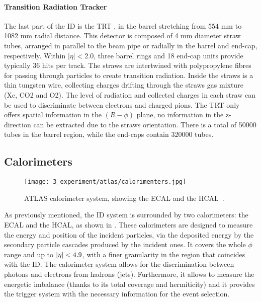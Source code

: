 \paragraph{Transition Radiation Tracker}
The last part of the \ac{ID} is the \ac{TRT} \cite{ATLAS-TRT-DesignPerformance}, in the barrel stretching from 554 mm to 1082 mm radial distance. This detector is composed of 4 mm diameter straw tubes, arranged in parallel to the beam pipe or radially in the barrel and end-cap, respectively. Within $|\eta| < 2.0$, three barrel rings and 18 end-cap units provide typically 36 hits per track. The straws are intertwined with polypropylene fibres for passing through particles to create transition radiation. Inside the straws is a thin tungsten wire, collecting charges drifting through the straws gas mixture (Xe, CO2 and O2). The level of radiation and collected charges in each straw can be used to discriminate between electrons and charged pions.  The \ac{TRT} only offers spatial information in the $(R-\phi)$ plane, no information in the z-direction can be extracted due to the straws orientation. There is a total of 50000 tubes in the barrel region, while the end-caps contain 320000 tubes.








\subsection{Calorimeters}

\begin{figure}[ht!]
    \centering
    \texttt{[image: 3\_experiment/atlas/calorimenters.jpg]}
    \caption{\ac{ATLAS} calorimeter system, showing the \acf{ECAL} and the \acf{HCAL}~\cite{ATLAS-Calorimeter-Diagram}.}
    \label{fig:atlas:atlas:atlas_calorimeters}
\end{figure}

As previously mentioned, the \ac{ID} system is surrounded by two calorimeters: the \acf{ECAL} and the \acf{HCAL}, as shown in \Fig{\ref{fig:atlas:atlas:atlas_calorimeters}}. These calorimeters are designed to measure the energy and position of the incident particles, via the deposited energy by the secondary particle cascades produced by the incident ones. It covers the whole \(\phi\) range and up to \(|\eta|<4.9\), with a finer granularity in the region that coincides with the \ac{ID}.
The calorimeter system allows for the discrimination between photons and electrons from hadrons (jets). Furthermore, it allows to measure the energetic imbalance (thanks to its total coverage and hermiticity) and it provides the trigger system with the necessary information for the event selection.

